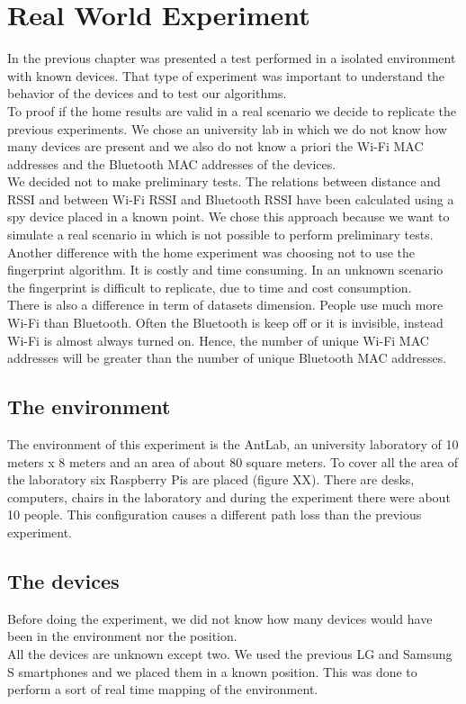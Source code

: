 \chapter{Real World Experiment}
\label{capitolo6}
\thispagestyle{empty}

In the previous chapter was presented a test performed in a isolated environment with known devices. That type of experiment was important to understand the behavior of the devices and to test our algorithms.\\
\linebreak
To proof if the home results are valid in a real scenario we decide to replicate the previous experiments. We chose an university lab in which we do not know how many devices are present and we also do not know a priori the Wi-Fi MAC addresses and the Bluetooth MAC addresses of the devices.\\
\linebreak
We decided not to make preliminary tests. The relations between distance and RSSI and between Wi-Fi RSSI and Bluetooth RSSI have been calculated using a spy device placed in a known point. We chose this approach because we want to simulate a real scenario in which is not possible to perform preliminary tests.\\
Another difference with the home experiment was choosing not to use the fingerprint algorithm. It is costly and time consuming. In an unknown scenario the fingerprint is difficult to replicate, due to time and cost consumption.\\
\linebreak
There is also a difference in term of datasets dimension. People use much more Wi-Fi than Bluetooth. Often the Bluetooth is keep off or it is invisible, instead Wi-Fi is almost always turned on. Hence, the number of unique Wi-Fi MAC addresses will be greater than the number of unique Bluetooth MAC addresses.

\section{The environment}
The environment of this experiment is the AntLab, an university laboratory of 10 meters x 8 meters and an area of about 80 square meters. To cover all the area of the laboratory six Raspberry Pis are placed (figure XX). There are desks, computers, chairs in the laboratory and during the experiment there were about 10 people. This configuration causes a different path loss than the previous experiment.
\section{The devices}
Before doing the experiment, we did not know how many devices would have been in the environment nor the position.\\
All the devices are unknown except two. We used the previous LG and Samsung S smartphones and we placed them in a known position. This was done to perform a sort of real time mapping of the environment. 

